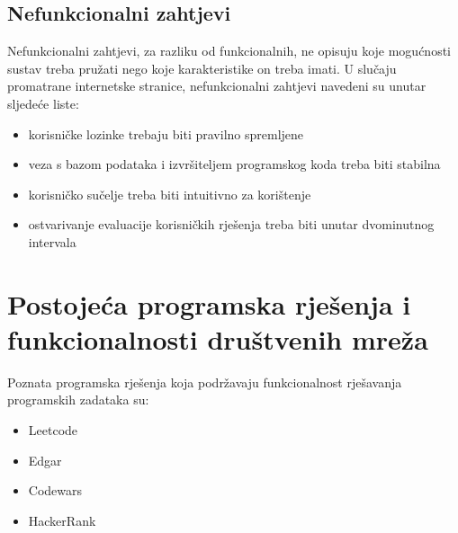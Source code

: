 \documentclass[times, utf8, zavrsni, numeric]{fer}
\begin{document}
		\section{Nefunkcionalni zahtjevi}
		Nefunkcionalni zahtjevi, za razliku od funkcionalnih, ne opisuju koje mogućnosti sustav treba pružati nego koje karakteristike on treba imati. U slučaju promatrane internetske stranice, nefunkcionalni zahtjevi navedeni su unutar sljedeće liste:
		\begin{itemize}
			\item korisničke lozinke trebaju biti pravilno spremljene
			\item veza s bazom podataka i izvršiteljem programskog koda treba biti stabilna
			\item korisničko sučelje treba biti intuitivno za korištenje
			\item ostvarivanje evaluacije korisničkih rješenja treba biti unutar dvominutnog intervala 
		\end{itemize}
	
	\chapter{Postojeća programska rješenja i funkcionalnosti društvenih mreža}
	Poznata programska rješenja koja podržavaju funkcionalnost rješavanja programskih zadataka su:
	\begin{itemize}
		\item Leetcode\cite{Leetcode2021}
		\item Edgar\cite{Edgar2021}
		\item Codewars\cite{Codewars2021}
		\item HackerRank\cite{HackerRank2021}
	\end{itemize}
	
\end{document}
